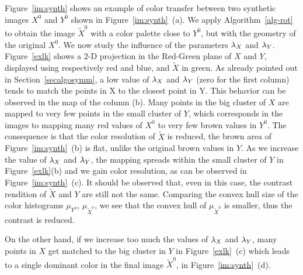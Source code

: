 Figure~\ref{im:synth} shows an example of color transfer between two synthetic images $X^0$ and $Y^0$ shown in Figure~\ref{im:synth}~(a). We apply Algorithm~\ref{alg-rot} to obtain the image ${\tilde X^0}$ with a color palette close to $Y^0$, but with the geometry of the original $X^0$. We now study the influence of the parameters $\lambda_X$ and $\lambda_Y$. Figure~\ref{exlk} shows a 2-D projection in the Red-Green plane of $X$ and $Y$, displayed using respectively red and blue, and $\tilde X$ in green. As already pointed out in Section~\ref{secalgosymm},  a low value of $\lambda_X$ and $\lambda_Y$ (zero for the first column) tends to match the points in X to the closest point in Y. This behavior can be observed in the map of the column (b). Many points in the big cluster of $X$ are mapped to very few points in the small cluster of $Y$, which corresponds in the images to mapping many red values of $X^0$ to very few brown values in $Y^0$. The consequence is that the color resolution of $\tilde X$ is reduced, the brown area of Figure~\ref{im:synth}~(b) is flat, unlike the original brown values in $Y$. As we increase the value of $\lambda_X$ and $\lambda_Y$, the mapping spreads within the small cluster of $Y$ in Figure~\ref{exlk}(b) and we gain color resolution, as can be observed in Figure~\ref{im:synth}~(c). It should be observed that, even in this case, the contrast rendition of $\tilde{X}$ and $Y$ are still not the same. Comparing the convex hull size of the color histograms $\mu_{Y^0}$, $\mu_{{\tilde X}^0}$, we see that the convex hull of $\mu_{{\tilde X}^0}$ is smaller, thus the contrast is reduced. 

On the other hand, if we increase too much the values of $\lambda_X$ and $\lambda_Y$, many points in $X$ get matched to the big cluster in $Y$ in Figure~\ref{exlk}~(c) which leads to a single dominant color in the final image $\tilde X^0$, in Figure~\ref{im:synth}~(d). 



\newlength{\mylenX} %
\newcommand{\sidecapX}[1]{ {\begin{sideways}\parbox{1.65cm}{\centering #1}\end{sideways}} }

